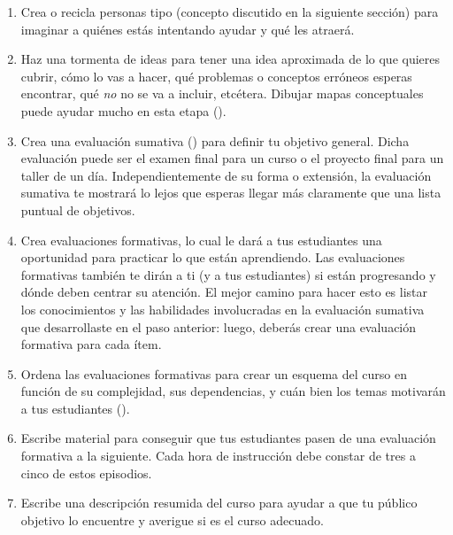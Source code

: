 \begin{enumerate}
 
\item
Crea o recicla personas tipo (concepto discutido en la siguiente sección)
para imaginar a quiénes estás intentando ayudar y qué les atraerá.

 \item
Haz una tormenta de ideas para tener una idea aproximada de lo que quieres cubrir,
cómo lo vas a hacer,
qué problemas o conceptos erróneos esperas encontrar,
qué \emph{no} no se va a incluir, etcétera.
Dibujar mapas conceptuales puede ayudar mucho en esta etapa ().
 
\item
Crea una evaluación sumativa ()
para definir tu objetivo general.
Dicha evaluación puede ser el examen final para un curso
o el proyecto final para un taller de un día.
Independientemente de su forma o extensión,
la evaluación sumativa te mostrará lo lejos que esperas llegar
más claramente que una lista puntual de objetivos.
 
\item
Crea evaluaciones formativas,
lo cual le dará a tus estudiantes una oportunidad para practicar lo que están aprendiendo.
Las evaluaciones formativas también te dirán a ti (y a tus estudiantes) si están progresando
y dónde deben centrar su atención.
El mejor camino para hacer esto es listar los conocimientos y las habilidades
involucradas en la evaluación sumativa que desarrollaste en el paso anterior: luego, deberás crear una evaluación formativa para cada ítem.
 
\item
Ordena las evaluaciones formativas para crear un esquema del curso
en función de su complejidad,
sus dependencias,
y cuán bien los temas motivarán a tus estudiantes ().
 
\item
Escribe material para conseguir que tus estudiantes pasen de una evaluación formativa a la siguiente.
Cada hora de instrucción debe constar de tres a cinco de estos episodios.
 
\item
Escribe una descripción resumida del curso
para ayudar a que tu público objetivo lo encuentre
y averigue si es el curso adecuado.
 \end{enumerate}
 

